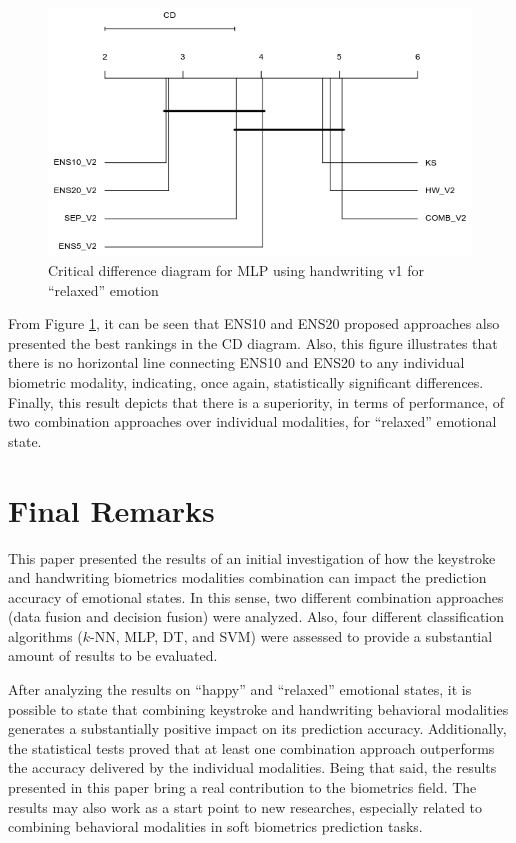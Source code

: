 \documentclass[conference]{IEEEtran}
\begin{document}
\begin{figure}[htbp]
  \centering
  \includegraphics[scale=0.5]{images/mlp_v2_relaxed.png}
  \caption{Critical difference diagram for MLP using handwriting v1 for ``relaxed'' emotion}
  \label{fig:cd-relaxed}
\end{figure}

From Figure \ref{fig:cd-relaxed}, it can be seen that ENS10 and ENS20 proposed approaches also presented
the best rankings in the CD diagram. Also, this figure illustrates that there is no horizontal line connecting ENS10 and ENS20 to any individual biometric modality, indicating, once again, statistically significant differences. Finally, this result depicts that there is a superiority, in terms of performance,  of two combination approaches over individual modalities, for ``relaxed'' emotional state. 


\section{Final Remarks}

This paper presented the results of an initial investigation of how the keystroke and handwriting biometrics modalities combination can impact the prediction accuracy of emotional states. In this sense, two different combination approaches (data fusion and decision fusion) were analyzed. Also, four different classification algorithms ($k$-NN, MLP, DT, and SVM) were assessed to provide a substantial amount of results to be evaluated.

After analyzing the results on ``happy''  and ``relaxed'' emotional states, it is possible to state that combining keystroke and handwriting behavioral modalities generates a substantially positive impact on its prediction accuracy.
Additionally, the statistical tests proved that at least one combination approach outperforms the accuracy delivered by the individual modalities.
Being that said, the results presented in this paper bring a real contribution to the biometrics field. The results may also work as a start point to new researches, especially related to combining behavioral modalities in soft biometrics prediction tasks.
\end{document}
